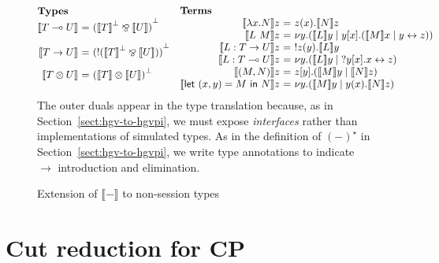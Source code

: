 \documentclass{easychair}
\makeatletter
\newcommand{\ba}{\begin{array}}
\newcommand{\ea}{\end{array}}
\newenvironment{eqs}{\ba{@{}r@{~}c@{~}l@{}}}{\ea}
\newcommand{\key}{\mathsf}
\newcommand{\lolli}{\multimap}
\newcommand{\gvLinFun}[2]{{#1} \lolli {#2}}
\newcommand{\gvUnFun}[2]{{#1} \to {#2}}
\newcommand{\gvTimes}[2]{{#1} \otimes {#2}}
\newcommand{\gvLam}[2]{\lambda {#1}.{#2}}
\newcommand{\gvApp}[2]{{#1}~{#2}}
\newcommand{\gvPair}[2]{({#1},{#2})}
\newcommand{\gvLet}[3]{\key{let}~{#1}={#2}~\key{in}~{#3}}
\newcommand{\cpLink}[2]{{#1} \leftrightarrow {#2}}
\newcommand{\cpCut}[3]{\nu {#1}.({#2} \mid {#3})}
\newcommand{\cpOutput}[4]{{#1}[{#2}].({#3} \mid {#4})}
\newcommand{\cpInput}[3]{{#1}({#2}).{#3}}
\newcommand{\cpServe}[3]{!{#1}({#2}).{#3}}
\newcommand{\cpRequest}[3]{?{#1}[{#2}].{#3}}
\newcommand{\cpTimes}[2]{{#1} \otimes {#2}}
\newcommand{\cpPar}[2]{{#1} \mathbin{\bindnasrepma} {#2}}
\newcommand{\cpOfCourse}[1]{\mathord{!}{#1}}
\newcommand{\cpDual}[1]{{#1}^\bot}
\newcommand{\lampi}[1]{({#1})^\star}
\newcommand{\hgvcp}[1]{\llbracket{#1}\rrbracket}
\makeatother
\begin{document}
\begin{figure}
\[
\ba{@{}cc@{}}
\begin{eqs}
\multicolumn{3}{@{}l@{}}{\textbf{Types}} \\
\hgvcp{\gvLinFun{T}{U}} &=& \cpDual{(\cpPar{\cpDual{\hgvcp{T}}}{\hgvcp{U}})} \\[2ex]
\hgvcp{\gvUnFun{T}{U}} &=& \cpDual{(\cpOfCourse{(\cpPar{\cpDual{\hgvcp{T}}}{\hgvcp{U}})})} \\[2ex]
\hgvcp{\gvTimes{T}{U}} &=& \cpDual{(\cpTimes{\hgvcp{T}}{\hgvcp{U}})} \\[2ex]
\end{eqs}%
&
\begin{eqs}
\multicolumn{3}{@{}l@{}}{\textbf{Terms}} \\
\hgvcp{\gvLam{x}{N}}z &=& \cpInput{z}{x}{\hgvcp{N}z} \\
\hgvcp{\gvApp{L}{M}}z &=& \cpCut{y}{\hgvcp{L}y}{\cpOutput{y}{x}{\hgvcp{M}x}{\cpLink{y}{z}}} \\
\hgvcp{L : \gvUnFun{T}{U}}z &=& \cpServe{z}{y}{\hgvcp{L}y} \\
\hgvcp{L : \gvLinFun{T}{U}}z &=& \cpCut{y}{\hgvcp{L}y}{\cpRequest{y}{x}{\cpLink{x}{z}}} \\
\hgvcp{\gvPair{M}{N}}z &=& \cpOutput{z}{y}{\hgvcp{M}y}{\hgvcp{N}z} \\
\hgvcp{\gvLet{\gvPair{x}{y}}{M}{N}}z
  &=& \cpCut{y}{\hgvcp{M}y}{\cpInput{y}{x}{\hgvcp{N}z}} \\
\end{eqs}%
\ea
\]
\footnotesize {The outer duals appear in the type translation because, as in
  Section~\ref{sect:hgv-to-hgvpi}, we must expose \emph{interfaces} rather than implementations of
  simulated types. As in the definition of $\lampi{-}$ in Section~\ref{sect:hgv-to-hgvpi}, we write
  type annotations to indicate $\to$ introduction and elimination.}

\caption{Extension of $\hgvcp{-}$ to non-session types}
\label{fig:hgvcp-ext}
\end{figure}

\newpage
\appendix



\section{Cut reduction for CP}
\label{sect:cp-cut}
\end{document}
